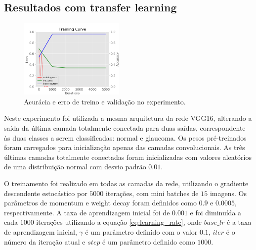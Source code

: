 \documentclass[conference]{IEEEtran}
\begin{document}


  \subsection{Resultados com transfer learning}


  \begin{figure}[!tp]
    \centering
    \includegraphics[width=2in]{img/curve_vgg16.png}
    \caption{Acurácia e erro de treino e validação no experimento.}
    \label{fig:acuracia_vgg16_transfer}
  \end{figure}


  Neste experimento foi utilizada a mesma arquitetura da rede VGG16, alterando a saída da última camada totalmente conectada para duas saídas, correspondente às duas classes a serem classificadas: normal e glaucoma. Os pesos pré-treinados foram carregados para inicialização apenas das camadas convolucionais. As três últimas camadas totalmente conectadas foram inicializadas com valores aleatórios de uma distribuição normal com desvio padrão $0.01$. %
  
  O treinamento foi realizado em todas as camadas da rede, utilizando o gradiente descendente estocástico por $5000$ iterações, com mini batches de $15$ imagens. Os parâmetros de momentum e weight decay foram definidos como $0.9$ e $0.0005$, respectivamente. A taxa de aprendizagem inicial foi de $0.001$ e foi diminuída a cada $1000$ iterações utilizando a equação \ref{eq:learning_rate}, onde $base\_lr$ é a taxa de aprendizagem inicial, $\gamma$ é um parâmetro definido com o valor $0.1$, $iter$ é o número da iteração atual e $step$ é um parâmetro definido como $1000$.
\end{document}
